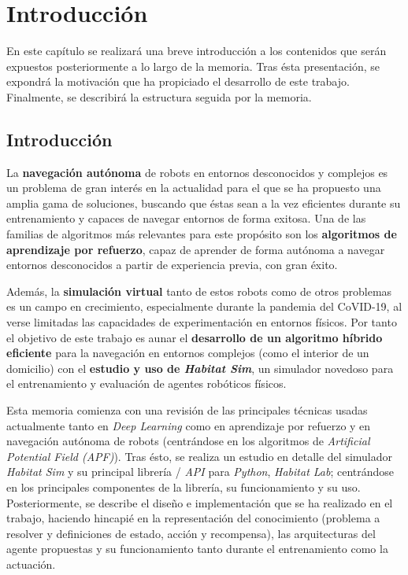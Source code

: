 \chapter{Introducción}

En este capítulo se realizará una breve introducción a los contenidos que serán expuestos posteriormente a lo largo de la memoria. Tras ésta presentación, se expondrá la motivación que ha propiciado el desarrollo de este trabajo. Finalmente, se describirá la estructura seguida por la memoria.

\section{Introducción}

La \textbf{navegación autónoma} de robots en entornos desconocidos y complejos es un problema de gran interés en la actualidad para el que se ha propuesto una amplia gama de soluciones, buscando que éstas sean a la vez eficientes durante su entrenamiento y capaces de navegar entornos de forma exitosa. Una de las familias de algoritmos más relevantes para este propósito son los \textbf{algoritmos de aprendizaje por refuerzo}, capaz de aprender de forma autónoma a navegar entornos desconocidos a partir de experiencia previa, con gran éxito.

Además, la \textbf{simulación virtual} tanto de estos robots como de otros problemas es un campo en crecimiento, especialmente durante la pandemia del CoVID-19, al verse limitadas las capacidades de experimentación en entornos físicos.  Por tanto el objetivo de este trabajo es aunar el \textbf{desarrollo de un algoritmo híbrido eficiente} para la navegación en entornos complejos (como el interior de un domicilio) con el \textbf{estudio y uso de \textit{Habitat Sim}}, un simulador novedoso para el entrenamiento y evaluación de agentes robóticos físicos.

Esta memoria comienza con una revisión de las principales técnicas usadas actualmente tanto en \textit{Deep Learning} como en aprendizaje por refuerzo y en navegación autónoma de robots (centrándose en los algoritmos de \textit{Artificial Potential Field (APF)}). Tras ésto, se realiza un estudio en detalle del simulador \textit{Habitat Sim} y su principal librería / \textit{API} para \textit{Python}, \textit{Habitat  Lab}; centrándose en los principales componentes de la librería, su funcionamiento y su uso. Posteriormente, se describe el diseño e implementación que se ha realizado en el trabajo, haciendo hincapié en la representación del conocimiento (problema a resolver y definiciones de estado, acción y recompensa), las arquitecturas del agente propuestas y su funcionamiento tanto durante el entrenamiento como la actuación. 

